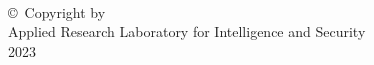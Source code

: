 
\thispagestyle{empty}
\hbox{\ }

\vfill
\renewcommand{\baselinestretch}{1}
\small\normalsize

\vspace{.5in}

\begin{center}
\large{\copyright \hbox{ }Copyright by\\
Applied Research Laboratory for Intelligence and Security  %
\\
2023}
\end{center}

\vfill

\newpage 
